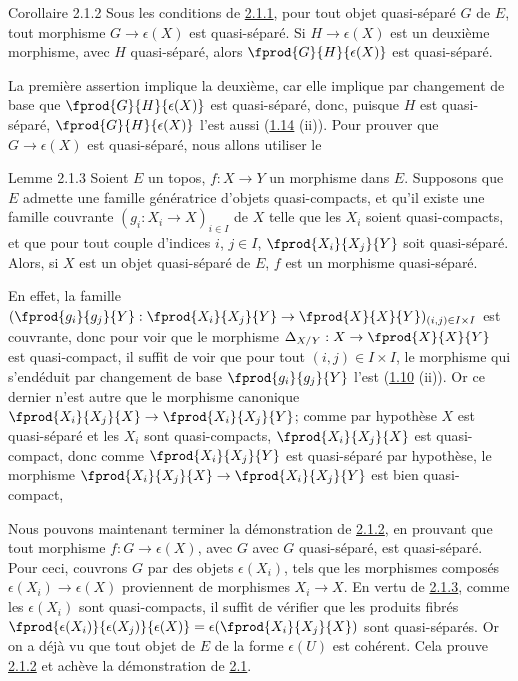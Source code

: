 \begin{enonce*}{Corollaire 2.1.2}
Sous les conditions de \hyperref[VI.cor2.1.1]{2.1.1}, pour tout objet quasi-séparé $G$ de $E$,
tout morphisme $G \to \epsilon(X)$ est quasi-séparé. Si $H \to
\epsilon(X)$ est un deuxième morphisme, avec $H$ quasi-séparé,
alors $\fprod{G}{H}{\epsilon(X)}$ est quasi-séparé.
\end{enonce*}

La première assertion implique la deuxième, car elle implique par
changement de base que $\fprod{G}{H}{\epsilon(X)}$ est quasi-séparé,
donc, puisque $H$ est quasi-séparé, $\fprod{G}{H}{\epsilon(X)}$
l'est aussi (\hyperref[VI.prop1.14]{1.14} (ii)). Pour prouver que $G \to \epsilon(X)$ est quasi-séparé,
nous allons utiliser le

\begin{enonce*}{Lemme 2.1.3}
Soient $E$ un topos, $f : X \to Y$ un morphisme dans $E$. Supposons
que $E$ admette une famille génératrice d'objets quasi-compacts, et
qu'il existe une famille couvrante $(g_i : X_i \to X)_{i \in I}$ de
$X$ telle que les $X_i$ soient quasi-compacts, et que pour tout couple
d'indices $i$, $j \in I$, $\fprod{X_i}{X_j}{Y}$ soit
quasi-séparé. Alors, si $X$ est un objet quasi-séparé de $E$, $f$ est
un morphisme quasi-séparé.
\end{enonce*}

En effet, la famille $(\fprod{g_i}{g_j}{Y} : \fprod{X_i}{X_j}{Y} \to
\fprod{X}{X}{Y})_{(i, j) \in I \times I}$ est couvrante, donc pour
voir que le morphisme $\Delta_{X/Y} : X \to \fprod{X}{X}{Y}$ est
quasi-compact, il suffit de voir que pour tout $(i, j) \in I \times
I$, le morphisme qui s'en\pageoriginale déduit par changement de base
$\fprod{g_i}{g_j}{Y}$ l'est (\hyperref[VI.prop1.10]{1.10} (ii)). Or ce dernier n'est autre que
le morphisme canonique $\fprod{X_i}{X_j}{X} \to \fprod{X_i}{X_j}{Y}$;
comme par hypothèse $X$ est quasi-séparé et les $X_i$ sont
quasi-compacts, $\fprod{X_{i}}{X_{j}}{X}$ est quasi-compact, donc
comme $\fprod{X_{i}}{X_{j}}{Y}$ est quasi-séparé par hypothèse, le
morphisme $\fprod{X_{i}}{X_{j}}{X}\to \fprod{X_{i}}{X_{j}}{Y}$ est
bien quasi-compact,\cqfd

Nous pouvons maintenant terminer la démonstration de \hyperref[VI.cor2.1.2]{2.1.2}, en
prouvant que tout morphisme $f : G \to \epsilon(X)$, avec $G$ avec
$G$ quasi-séparé, est quasi-séparé. Pour ceci, couvrons $G$ par des
objets $\epsilon(X_i)$, tels que les morphismes composés
$\epsilon(X_i) \to \epsilon(X)$ proviennent de morphismes $X_i
\to X$. En vertu de \hyperref[VI.lem2.1.3]{2.1.3}, comme les $\epsilon(X_i)$ sont
quasi-compacts, il suffit de vérifier que les produits fibrés
$\fprod{\epsilon(X_i)}{\epsilon(X_j)}{\epsilon(X)} =
\epsilon(\fprod{X_i}{X_j}{X})$ sont quasi-séparés. Or on a déjà vu
que tout objet de $E$ de la forme $\epsilon(U)$ est cohérent. Cela
prouve \hyperref[VI.cor2.1.2]{2.1.2} et achève la démonstration de \hyperref[VI.prop2.1]{2.1}.


